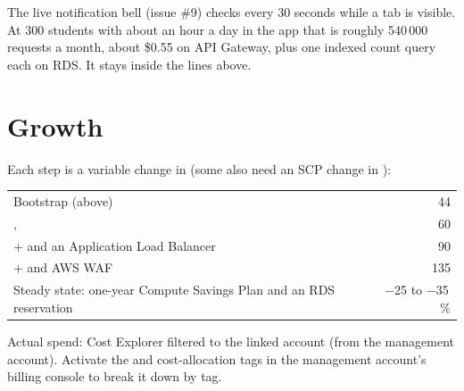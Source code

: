 \begin{note}
  The live notification bell (issue \#9) checks  every 30
  seconds while a tab is visible. At 300 students with about an hour a day in the app that is
  roughly 540\,000 requests a month, about \$0.55 on API Gateway, plus one indexed count query
  each on RDS. It stays inside the lines above.
\end{note}

\section{Growth}
Each step is a variable change in  (some also need an SCP
change in ):

\begin{xltabular}{\linewidth}{@{}L r@{}}
  \toprule
   & \\
  \midrule
  Bootstrap (above) & 44\\
  ,  & 60\\
  \quad +  and an Application Load Balancer & 90\\
  \quad +  and AWS WAF & 135\\
  Steady state: one-year Compute Savings Plan and an RDS reservation & $-$25 to $-$35\,\%\\
  \bottomrule
\end{xltabular}

\begin{auditnote}
  Actual spend: Cost Explorer filtered to the linked account (from the management account).
  Activate the  and  cost-allocation tags in the management account's
  billing console to break it down by tag.
\end{auditnote}
